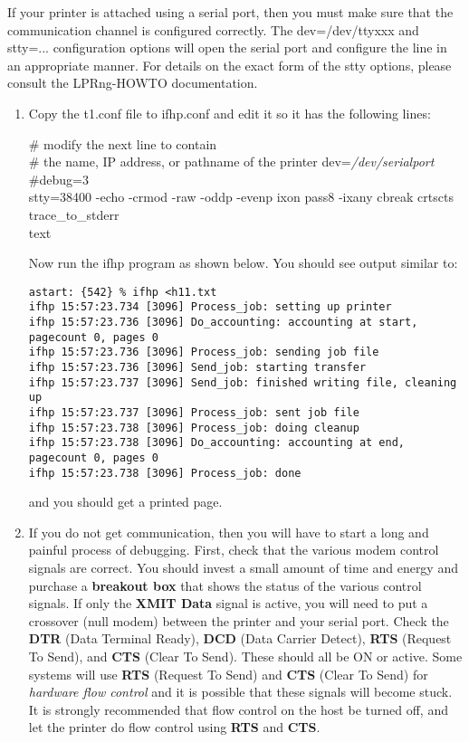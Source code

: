 \documentclass[a4paper]{article}
\begin{document}
If your printer is attached using a serial port,
then you must make sure that the communication channel is
configured correctly.
The
{\ttfamily dev=/dev/ttyxxx}
and
{\ttfamily stty=...}
configuration options will open the serial port
and configure the line in an appropriate manner.
For details on the exact form of the
{\ttfamily stty} options,
please consult the
LPRng-HOWTO documentation.
\begin{enumerate}
\item Copy the
{\ttfamily t1.conf}
file to
{\ttfamily ifhp.conf} and edit it
so it has the following lines:
\begin{tscreen}
\# modify the next line to contain \\ 
\#  the name, IP address, or pathname of the printer
dev={\itshape /dev/serialport \/}\\ 
\#debug=3 \\ 
stty=38400 -echo -crmod -raw -oddp -evenp ixon
pass8 -ixany cbreak crtscts
trace\_to\_stderr \\ 
text 
\end{tscreen}

Now run the
{\ttfamily ifhp}
program as shown below.
You should see output similar to:
\begin{tscreen}
\begin{verbatim}
astart: {542} % ifhp <h11.txt
ifhp 15:57:23.734 [3096] Process_job: setting up printer
ifhp 15:57:23.736 [3096] Do_accounting: accounting at start, pagecount 0, pages 0
ifhp 15:57:23.736 [3096] Process_job: sending job file
ifhp 15:57:23.736 [3096] Send_job: starting transfer
ifhp 15:57:23.737 [3096] Send_job: finished writing file, cleaning up
ifhp 15:57:23.737 [3096] Process_job: sent job file
ifhp 15:57:23.738 [3096] Process_job: doing cleanup
ifhp 15:57:23.738 [3096] Do_accounting: accounting at end, pagecount 0, pages 0
ifhp 15:57:23.738 [3096] Process_job: done
\end{verbatim}
\end{tscreen}

and you should get a printed page.

\item If you do not get communication,
then you will have to start a long and painful process of debugging.
First,
check that the various modem control signals
are correct.
You should invest a small amount of time and energy and purchase
a
{\bfseries breakout box} that shows the status of the various control signals.
If only the
{\bfseries XMIT Data} signal is active,
you will need to put a crossover (null modem)
between the printer and your serial port.
Check the
{\bfseries DTR} (Data Terminal Ready),
{\bfseries DCD} (Data Carrier Detect),
{\bfseries RTS} (Request To Send),
and
{\bfseries CTS} (Clear To Send).
These should all be ON or active.
Some systems will use
{\bfseries RTS} (Request To Send)
and
{\bfseries CTS} (Clear To Send) for
{\itshape hardware flow control\/}
and it is possible that these signals will become stuck.
It is strongly recommended that flow control on the host be turned off,
and let the printer do flow control using 
{\bfseries RTS} and
{\bfseries CTS}.


\end{enumerate}
\end{document}
